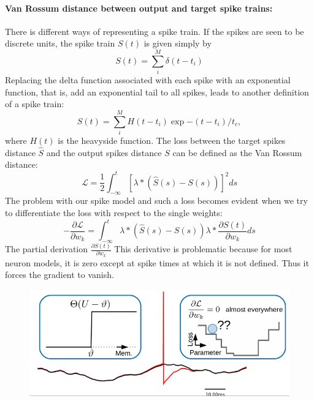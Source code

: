 \documentclass[main]{subfiles}
\begin{document}
\paragraph{Van Rossum distance between output and target spike trains:}
There is different ways of representing a spike train. If the spikes are seen to be discrete units, the spike train $S(t)$ is given simply by
%
\begin{equation}
    S(t) = \sum_i^M \delta(t-t_i)
\end{equation}
%
Replacing the delta function associated with each spike with an exponential function, that is, add an exponential tail to all spikes, leads to another definition of a spike train:
%
\begin{equation}
    S(t) = \sum_i^M H(t-t_i)\exp{-(t-t_i)/t_c},
\end{equation}
%
where $H(t)$ is the heavyside function. The loss between the target spikes distance $\hat{S}$ and the output spikes distance $S$ can be defined as the Van Rossum distance:
%
\begin{equation}
\mathcal{L}=\frac{1}{2} \int_{-\infty}^{t}[\lambda *(\hat{S}(s)-S(s))]^{2} ds
\end{equation}
%
The problem with our spike model and such a loss becomes evident when we try to differentiate the loss with respect to the single weights:
%
\begin{equation}
-\frac{\partial \mathcal{L}}{\partial w_{k}}=\int_{-\infty}^{t} \lambda *(\hat{S}(s)-S(s)) \lambda * \frac{\partial S(t)}{\partial w_{k}} d s
\end{equation}
%
The partial derivation $\frac{\partial S(t)}{\partial w_{k}}$ This derivative is problematic because for most neuron models, it is zero except at spike times at which it is not defined. Thus it forces the gradient to vanish. 
%
\begin{figure}[H]
    \centering
    \includegraphics[width=0.8\linewidth]{10_DeepLearningWithSpikes/figures/vanishing.png}
    \caption{}
    \label{fig:my_label}
\end{figure}
%
\end{document}
